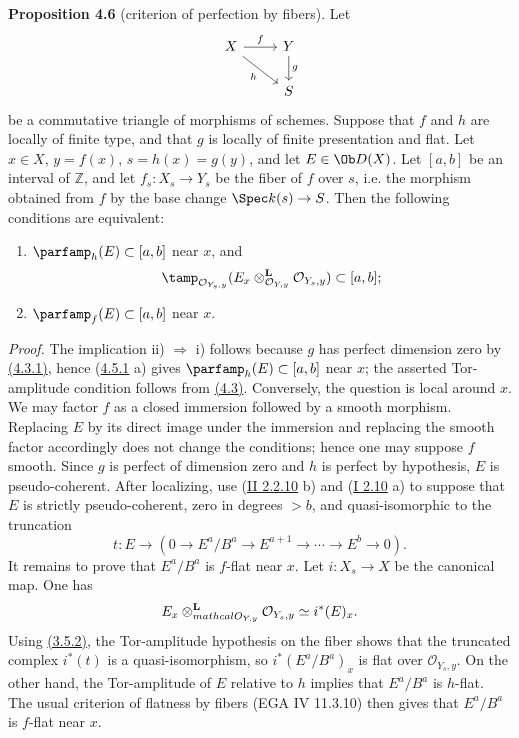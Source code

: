\textbf{Proposition 4.6} (criterion of perfection by fibers). Let
\[
\begin{tikzcd}
X \arrow[r,"f"] \arrow[dr,"h"'] & Y \arrow[d,"g"]\\
& S
\end{tikzcd}
\]
be a commutative triangle of morphisms of schemes. Suppose that \(f\) and \(h\) are locally of finite type, and that \(g\) is locally of finite presentation and flat. Let \(x\in X\), \(y=f(x)\), \(s=h(x)=g(y)\), and let \(E\in\Ob D(X)\). Let \([a,b]\) be an interval of \(\mathbb Z\), and let \(f_s:X_s\to Y_s\) be the fiber of \(f\) over \(s\), i.e. the morphism obtained from \(f\) by the base change \(\Spec k(s)\to S\). Then the following conditions are equivalent:
\begin{enumerate}[label=\roman*)]
\item \(\parfamp_h(E)\subset[a,b]\) near \(x\), and
\[
 \tamp_{\mathcal O_{Y_s,y}}(E_x\otimes_{\mathcal O_{Y,y}}^{\mathbf L}\mathcal O_{Y_s,y})
 \subset[a,b];
\]
\item \(\parfamp_f(E)\subset[a,b]\) near \(x\).
\end{enumerate}

\emph{Proof.} The implication ii) \(\Rightarrow\) i) follows because \(g\) has perfect dimension zero by \hyperlink{sga6.e03.cor.4-3-1}{(4.3.1)}, hence (\hyperlink{sga6.e03.cor.4-5-1}{4.5.1} a) gives \(\parfamp_h(E)\subset[a,b]\) near \(x\); the asserted Tor-amplitude condition follows from \hyperlink{sga6.e03.prop.4-3}{(4.3)}. Conversely, the question is local around \(x\). We may factor \(f\) as a closed immersion followed by a smooth morphism. Replacing \(E\) by its direct image under the immersion and replacing the smooth factor accordingly does not change the conditions; hence one may suppose \(f\) smooth. Since \(g\) is perfect of dimension zero and \(h\) is perfect by hypothesis, \(E\) is pseudo-coherent. After localizing, use (\hyperlink{sga6.e02.rem.2-2-10}{II 2.2.10} b) and (\hyperlink{sga6.e01.prop.2-10}{I 2.10} a) to suppose that \(E\) is strictly pseudo-coherent, zero in degrees \(>b\), and quasi-isomorphic to the truncation
\[
 t:
 E\longrightarrow
 (0\to E^a/B^a\to E^{a+1}\to\cdots\to E^b\to0).
\]
It remains to prove that \(E^a/B^a\) is \(f\)-flat near \(x\). Let \(i:X_s\to X\) be the canonical map. One has
\[
 E_x\otimes_{\\mathcal O_{Y,y}}^{\mathbf L}\mathcal O_{Y_s,y}
 \simeq i^*(E)_x.
\]
Using \hyperlink{sga6.e03.cor.3-5-2}{(3.5.2)}, the Tor-amplitude hypothesis on the fiber shows that the truncated complex \(i^*(t)\) is a quasi-isomorphism, so \(i^*(E^a/B^a)_x\) is flat over \(\mathcal O_{Y_s,y}\). On the other hand, the Tor-amplitude of \(E\) relative to \(h\) implies that \(E^a/B^a\) is \(h\)-flat. The usual criterion of flatness by fibers (EGA IV 11.3.10) then gives that \(E^a/B^a\) is \(f\)-flat near \(x\).

